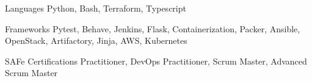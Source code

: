 
\begin{cvskills}
  \cvskill
    {Languages} %
    {Python, Bash, Terraform, Typescript} %

  \cvskill
    {Frameworks} %
    {
        Pytest,
        Behave,
        Jenkins,
        Flask,
        Containerization,
        Packer,
        Ansible,
        OpenStack,
        Artifactory,
        Jinja,
        AWS,
        Kubernetes
    } %

  \cvskill
    {SAFe Certifications}
    {Practitioner, DevOps Practitioner, Scrum Master, Advanced Scrum Master}

\end{cvskills}
